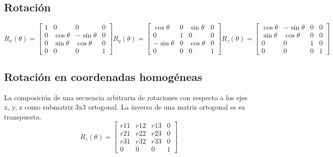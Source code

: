 \subsection{Rotación}
$$R_x(\theta)=\left[\begin{matrix}
			1 & 0           & 0             & 0 \\
			0 & \cos \theta & - \sin \theta & 0 \\
			0 & \sin \theta & \cos \theta   & 0 \\
			0 & 0           & 0             & 1
		\end{matrix}\right]
	R_y(\theta)=\left[\begin{matrix}
			\cos \theta   & 0 & \sin \theta & 0 \\
			0             & 1 & 0           & 0 \\
			- \sin \theta & 0 & \cos \theta & 0 \\
			0             & 0 & 0           & 1
		\end{matrix}\right]
	R_z(\theta)=\left[\begin{matrix}
			\cos \theta & -\sin \theta & 0 & 0 \\
			\sin \theta & \cos \theta  & 0 & 0 \\
			0           & 0            & 1 & 0 \\
			0           & 0            & 0 & 1
		\end{matrix}\right]$$

\subsection{Rotación en coordenadas homogéneas}
La composición de una secuencia arbitraria de rotaciones con respecto a los ejes x, y, z como submatriz 3x3 ortogonal. La inversa de una matriz ortogonal es su transpuesta.
$$R_z(\theta)=\left[\begin{matrix}
			r11 & r12 & r13 & 0 \\
			r21 & r22 & r23 & 0 \\
			r31 & r32 & r33 & 0 \\
			0   & 0   & 0   & 1
		\end{matrix}\right]$$
\pagebreak

